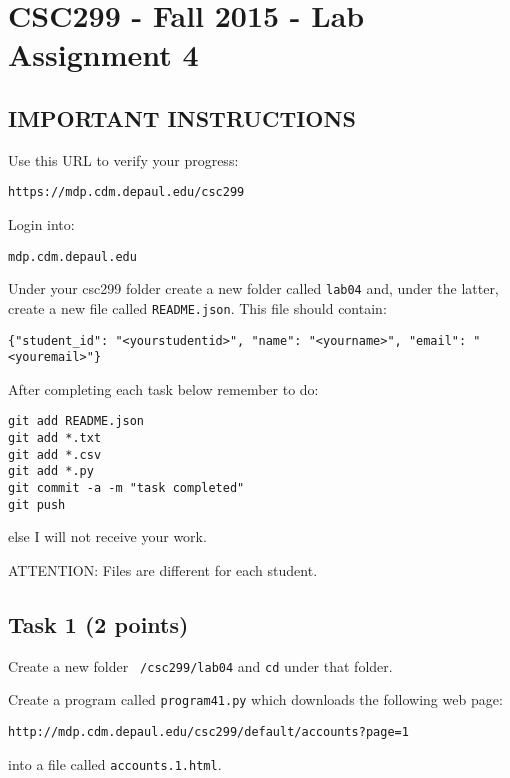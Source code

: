 \documentclass[12pt]{article}
\begin{document}
\section{CSC299 - Fall 2015 - Lab Assignment 4}

\subsection*{IMPORTANT INSTRUCTIONS}

\noindent Use this URL to verify your progress:
\begin{verbatim}
https://mdp.cdm.depaul.edu/csc299
\end{verbatim}

\noindent Login into:
\begin{verbatim}
mdp.cdm.depaul.edu
\end{verbatim}

\noindent Under your csc299 folder create a new folder called {\tt lab04} and, under the latter, create a new file called {\tt README.json}. This file should contain:

\begin{verbatim}
{"student_id": "<yourstudentid>", "name": "<yourname>", "email": "<youremail>"}
\end{verbatim}

\noindent After completing each task below remember to do:

\begin{verbatim}
git add README.json
git add *.txt
git add *.csv 
git add *.py
git commit -a -m "task completed"
git push
\end{verbatim}

\noindent  else I will not receive your work.

\noindent ATTENTION: Files are different for each student.

\subsection{Task 1 (2 points)}

\noindent  Create a new folder {\tt ~/csc299/lab04} and {\tt cd} under that folder.

\noindent  Create a program called {\tt program41.py} which downloads the following web page:
\begin{verbatim}
http://mdp.cdm.depaul.edu/csc299/default/accounts?page=1
\end{verbatim}

\noindent into a file called {\tt accounts.1.html}.
\end{document}
